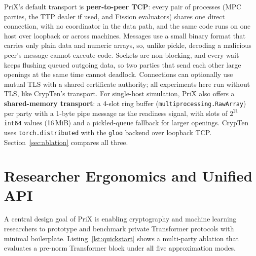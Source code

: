 \documentclass[11pt]{article}
\begin{document}
PriX's default transport is \textbf{peer-to-peer TCP}: every pair of processes (MPC parties, the TTP dealer if used, and Fission evaluators) shares one direct connection, with no coordinator in the data path, and the same code runs on one host over loopback or across machines. Messages use a small binary format that carries only plain data and numeric arrays, so, unlike pickle, decoding a malicious peer's message cannot execute code. Sockets are non-blocking, and every wait keeps flushing queued outgoing data, so two parties that send each other large openings at the same time cannot deadlock. Connections can optionally use mutual TLS with a shared certificate authority; all experiments here run without TLS, like CrypTen's transport. For single-host simulation, PriX also offers a \textbf{shared-memory transport}: a 4-slot ring buffer (\texttt{multiprocessing.RawArray}) per party with a 1-byte pipe message as the readiness signal, with slots of $2^{21}$ \texttt{int64} values (16\,MiB) and a pickled-queue fallback for larger openings. CrypTen uses \texttt{torch.distributed} with the \texttt{gloo} backend over loopback TCP. Section~\ref{sec:ablation} compares all three.

\section{Researcher Ergonomics and Unified API}
\label{sec:api}

A central design goal of PriX is enabling cryptography and machine learning researchers to prototype and benchmark private Transformer protocols with minimal boilerplate. Listing~\ref{lst:quickstart} shows a multi-party ablation that evaluates a pre-norm Transformer block under all five approximation modes.
\end{document}
